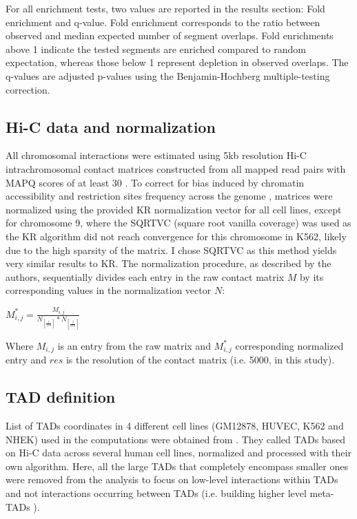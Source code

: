 \documentclass[11pt,a4paper]{report}
\begin{document}
For all enrichment tests, two values are reported in the results section: Fold enrichment and q-value. Fold enrichment corresponds to the ratio between observed and median expected number of segment overlaps. Fold enrichments above 1 indicate the tested segments are enriched compared to random expectation, whereas those below 1 represent depletion in observed overlaps. The q-values are adjusted p-values using the Benjamin-Hochberg multiple-testing correction.

\subsection*{Hi-C data and normalization}

All chromosomal interactions were estimated using 5kb resolution Hi-C intrachromosomal contact matrices constructed from all mapped read pairs with MAPQ scores of at least 30 \cite{Rao2014}. To correct for bias induced by chromatin accessibility and restriction sites frequency across the genome \cite{Rao2014}, matrices were normalized using the provided KR normalization vector for all cell lines, except for chromosome 9, where the SQRTVC (square root vanilla coverage) was used as the KR algorithm did not reach convergence for this chromosome in K562, likely due to the high sparsity of the matrix. I chose SQRTVC as this method yields very similar results to KR. 
The normalization procedure, as described by the authors, sequentially divides each entry in the raw contact matrix $M$ by its corresponding values in the normalization vector $N$:

\vspace{0.2in}
$M^*_{i,j}=\frac{M_{i,j}}{N_{[\frac{i}{res}]}*N_{[\frac{j}{res}]}}$
\vspace{0.2in}

\noindent Where $M_{i,j}$ is an entry from the raw matrix and $M^*_{i,j}$ corresponding normalized entry and $res$ is the resolution of the contact matrix (i.e. 5000, in this study).

\subsection*{TAD definition}

List of TADs coordinates in 4 different cell lines (GM12878, HUVEC, K562 and NHEK) used in the computations were obtained from \cite{Rao2014}. They called TADs based on Hi-C data across several human cell lines, normalized and processed with their own algorithm. Here, all the large TADs that completely encompass smaller ones were removed from the analysis to focus on low-level interactions within TADs and not interactions occurring between TADs (i.e. building higher level meta-TADs \cite{Fraser2015}).
\end{document}
